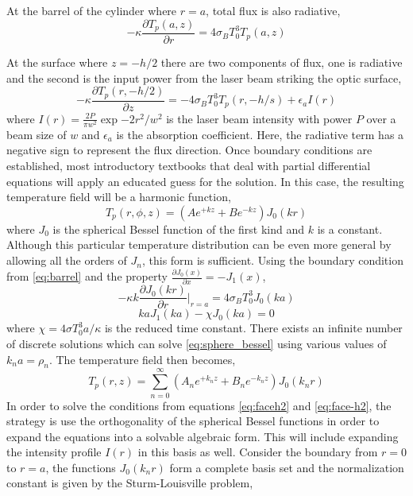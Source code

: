 	At the barrel of the cylinder where $r=a$, total flux is also radiative,
	\begin{equation}\label{eq:barrel}
	-\kappa \frac{\partial T_p(a,z)}{\partial r} = 4 \sigma_B  T_0^3 T_p(a,z)
	\end{equation}
	
	At the surface where $z=-h/2$ there are two components of flux, one is radiative and the second is the input power from the laser beam striking the optic surface,
	\begin{equation}\label{eq:face-h2}
		-\kappa \frac{\partial T_p(r,-h/2)}{\partial z} =  -4 \sigma_B T_0^3 T_p(r,-h/s) + \epsilon_a I(r)
	\end{equation}
	where $I(r) = \frac{2P}{\pi w^2} \exp{-2r^2/w^2}$ is the laser beam intensity with power $P$ over a beam size of $w$ and $\epsilon_a$ is the absorption coefficient.  Here, the radiative term has a negative sign to represent the flux direction. Once boundary conditions are established,  most introductory textbooks that deal with partial differential equations will apply an educated guess for the solution.  In this case, the resulting temperature field will be a harmonic function,
	\begin{equation}
	T_p(r,\phi,z) =  (A e^{+k z} + B e^{-kz}) J_0(kr)
	\end{equation}
	where $J_0$ is the spherical Bessel function of the first kind and $k$ is a constant.  Although this particular temperature distribution can be even more general by allowing all the orders of $J_n$, this form is sufficient. Using the boundary condition from \ref{eq:barrel} and the property $\frac{\partial J_0(x)}{\partial x} = -J_1(x)$,
	\begin{equation}
		-\kappa k \frac{\partial J_0(kr)}{\partial r} \bigg\vert_{r=a} = 4 \sigma_B T_0^3 J_0(ka)
	\end{equation}
	\begin{equation}\label{eq:sphere_bessel}
		ka J_1(ka) - \chi J_0(ka)=0
	\end{equation}
	where $\chi = 4\sigma T_0^3 a/\kappa$ is the reduced time constant.  There exists an infinite number of discrete solutions which can solve \ref{eq:sphere_bessel} using various values of $k_n a = \rho_n$.
	The temperature field then becomes,
	\begin{equation}\label{eq:temp2}
	T_p(r,z) = \sum_{n=0}^{\infty} (A_n e^{+k_n z} + B_n e^{-k_n z}) J_0(k_n r)
	\end{equation}
	In order to solve the conditions from equations \ref{eq:faceh2} and \ref{eq:face-h2}, the strategy is use the orthogonality of the spherical Bessel functions in order to expand the equations into a solvable algebraic form.  This will include expanding the intensity profile $I(r)$ in this basis as well.  Consider the boundary from $r=0$ to $r=a$, the functions $J_0(k_n r)$ form a complete basis set and the normalization constant is given by the Sturm-Louisville problem,
